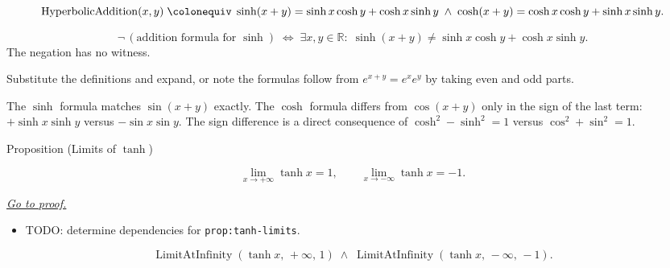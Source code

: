 \begin{remark*}
\[
  \operatorname{HyperbolicAddition}(x,y)
  \;\colonequiv\;
  \sinh(x+y) = \sinh x\cosh y + \cosh x\sinh y
  \;\wedge\;
  \cosh(x+y) = \cosh x\cosh y + \sinh x\sinh y.
\]
\end{remark*}

\begin{remark*}
\[
  \neg\,(\text{addition formula for }\sinh)
  \;\iff\;
  \exists x,y\in\mathbb{R}:\;
  \sinh(x+y) \neq \sinh x\cosh y + \cosh x\sinh y.
\]
The negation has no witness.
\end{remark*}

\begin{remark*}
Substitute the definitions and expand, or note the formulas follow
from $e^{x+y} = e^x e^y$ by taking even and odd parts.
\end{remark*}

\begin{remark*}
The $\sinh$ formula matches $\sin(x+y)$ exactly. The $\cosh$ formula
differs from $\cos(x+y)$ only in the sign of the last term:
$+\sinh x\sinh y$ versus $-\sin x\sin y$. The sign difference is a
direct consequence of $\cosh^2 - \sinh^2 = 1$ versus
$\cos^2 + \sin^2 = 1$.
\end{remark*}


\begin{propositionbox}{Proposition (Limits of $\tanh$)}
\begin{proposition}
\label{prop:tanh-limits}
\[
  \lim_{x \to +\infty} \tanh x = 1,
  \qquad
  \lim_{x \to -\infty} \tanh x = -1.
\]

\smallskip\noindent
\hyperref[prf:tanh-limits]{\textit{Go to proof.}}
\end{proposition}
\end{propositionbox}

\begin{dependencies}
\begin{itemize}
  \item TODO: determine dependencies for \texttt{prop:tanh-limits}.
\end{itemize}
\end{dependencies}

\begin{remark*}
\[
  \operatorname{LimitAtInfinity}(\tanh x,\,+\infty,\,1)
  \;\wedge\;
  \operatorname{LimitAtInfinity}(\tanh x,\,-\infty,\,-1).
\]
\end{remark*}

